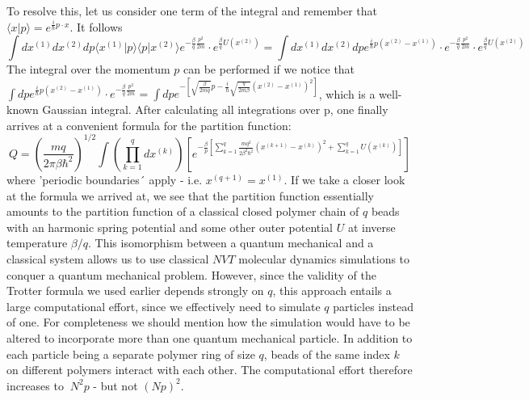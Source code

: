 To resolve this, let us consider one term of the integral and remember that $\langle x | p \rangle = e^{\frac{i}{\hbar}p\cdot x}$. It follows 
\begin{equation}
\int dx^{(1)}dx^{(2)} dp \langle x^{(1)} | p \rangle \langle p | x^{(2)}\rangle e^{-\frac{\beta}{q} \frac{p^2}{2m}} \cdot e^{\frac{\beta}{q}U(x^{(2)})} = \int dx^{(1)} dx^{(2)} dp e^{\frac{i}{\hbar}p(x^{(2)}-x^{(1)})} \cdot e^{-\frac{\beta}{q} \frac{p^2}{2m}} \cdot e^{\frac{\beta}{q}U(x^{(2)})}
\end{equation}
The integral over the momentum $p$ can be performed if we notice that $\int dp e^{\frac{i}{\hbar}p(x^{(2)}-x^{(1)})} \cdot e^{-\frac{\beta}{q} \frac{p^2}{2m}} = \int dp e^{-\left[\sqrt{\frac{\beta}{2mq}}p-\frac{i}{\hbar}\sqrt{\frac{q}{2m\beta}}\left(x^{(2)}-x^{(1)}\right)^2\right]}$, which is a well-known Gaussian integral. After calculating all integrations over p, one finally arrives at a convenient formula for the partition function: 
\begin{equation}
Q = \left(\frac{mq}{2\pi\beta\hbar^2}\right)^{1/2} \int \left(\prod_{k=1}^{q} dx^{(k)}\right) \left[ e^{-\frac{\beta}{p}\left[\sum_{k=1}^{q} \frac{mq^2}{2\beta^2\hbar^2}(x^{(k+1)}-x^{(k)})^2 + \sum_{k=1}^{q} U(x^{(k)})\right]}\right]
\end{equation}
where 'periodic boundaries´ apply - i.e. $x^{(q+1)} = x^{(1)}$. If we take a closer look at the formula we arrived at, we see that the partition function essentially amounts to the partition function of a classical closed polymer chain of $q$ beads with an harmonic spring potential and some other outer potential $U$ at inverse temperature $\beta/q$. This isomorphism between a quantum mechanical and a classical system allows us to use classical $NVT$ molecular dynamics simulations to conquer a quantum mechanical problem. However, since the validity of the Trotter formula we used earlier depends strongly on $q$, this approach entails a large computational effort, since we effectively need to simulate $q$ particles instead of one. 
For completeness we should mention how the simulation would have to be altered to incorporate more than one quantum mechanical particle. In addition to each particle being a separate polymer ring of size $q$, beads of the same index $k$ on different polymers interact with each other. The computational effort therefore increases to $~N^2p$ - but not $(Np)^2$.
